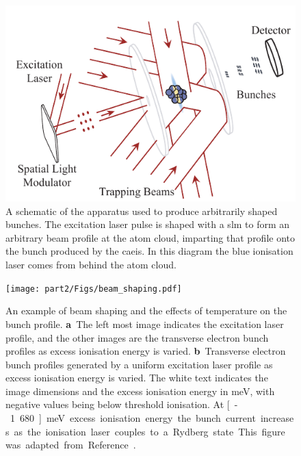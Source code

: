 \begin{figure}
    \center
    \includegraphics{part2/Figs/beam_shaping_schem.pdf}
    \caption[A schematic of the apparatus used to produce arbitrarily shaped bunches.]{A schematic of the apparatus used to produce arbitrarily shaped bunches. The excitation laser pulse is shaped with a \gls{slm} to form an arbitrary beam profile at the atom cloud, imparting that profile onto the bunch produced by the \gls{caeis}. In this diagram the blue ionisation laser comes from behind the atom cloud.}
    \label{figure:beam_shaping_schematic}
\end{figure}

\begin{figure}
    \center
    \texttt{[image: part2/Figs/beam\_shaping.pdf]}
    \caption[Beam shaping and the effects of temperature.]{An example of beam shaping and the effects of temperature on the bunch profile.
    \textbf{a}~The left most image indicates the excitation laser profile, and the other images are the transverse electron bunch profiles as excess ionisation energy is varied.
    \textbf{b}~Transverse electron bunch profiles generated by a uniform excitation laser profile as excess ionisation energy is varied.
    The white text indicates the image dimensions and the excess ionisation energy in meV, with negative values being below threshold ionisation.
    At \unit[-1.680]{meV} excess ionisation energy the bunch current increases as the ionisation laser couples to a Rydberg state.
    This figure was adapted from Reference~\cite{mcculloch_arbitrarily_2011}.}
    \label{figure:beam_shaping}
\end{figure}

